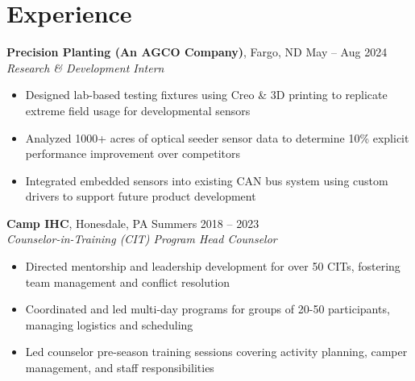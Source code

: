 \documentclass[10pt]{article}
\begin{document}
\section*{Experience}
\textbf{Precision Planting (An AGCO Company)}, Fargo, ND \hfill May -- Aug 2024 \\
\textit{Research \& Development Intern}
\begin{itemize}
  \item Designed lab-based testing fixtures using Creo \& 3D printing to replicate extreme field usage for developmental sensors
  \item Analyzed 1000+ acres of optical seeder sensor data to determine 10\% explicit performance improvement over competitors
  \item Integrated embedded sensors into existing CAN bus system using custom drivers to support future product development
\end{itemize}
\vspace{0.5em}
\textbf{Camp IHC}, Honesdale, PA \hfill Summers 2018 -- 2023 \\
\textit{Counselor-in-Training (CIT) Program Head Counselor}
\begin{itemize}
  \item Directed mentorship and leadership development for over 50 CITs, fostering team management and conflict resolution
  \item Coordinated and led multi-day programs for groups of 20-50 participants, managing logistics and scheduling
  \item Led counselor pre-season training sessions covering activity planning, camper management, and staff responsibilities
\end{itemize}
\end{document}
